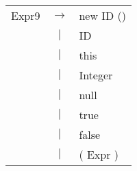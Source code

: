 \documentclass{article}
\begin{document}
\begin{tabular}{ l c l }
	Expr9 & $\rightarrow$ & new ID () \\
 	& $|$ & ID \\
 	& $|$ & this \\
 	& $|$ & Integer \\
 	& $|$ & null \\
 	& $|$ & true \\
 	& $|$ & false \\
	& $|$ & ( Expr ) \\





\end{tabular}

\end{document}
